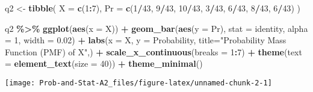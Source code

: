\documentclass[
]{article}
\newenvironment{Shaded}{\begin{snugshade}}{\end{snugshade}}
\newcommand{\AttributeTok}[1]{\textcolor[rgb]{0.13,0.29,0.53}{#1}}
\newcommand{\DecValTok}[1]{\textcolor[rgb]{0.00,0.00,0.81}{#1}}
\newcommand{\FloatTok}[1]{\textcolor[rgb]{0.00,0.00,0.81}{#1}}
\newcommand{\FunctionTok}[1]{\textcolor[rgb]{0.13,0.29,0.53}{\textbf{#1}}}
\newcommand{\NormalTok}[1]{#1}
\newcommand{\OtherTok}[1]{\textcolor[rgb]{0.56,0.35,0.01}{#1}}
\newcommand{\SpecialCharTok}[1]{\textcolor[rgb]{0.81,0.36,0.00}{\textbf{#1}}}
\newcommand{\StringTok}[1]{\textcolor[rgb]{0.31,0.60,0.02}{#1}}
\begin{document}
\begin{Shaded}
\begin{Highlighting}[]
\NormalTok{q2 }\OtherTok{\textless{}{-}} \FunctionTok{tibble}\NormalTok{(}
  \AttributeTok{X =} \FunctionTok{c}\NormalTok{(}\DecValTok{1}\SpecialCharTok{:}\DecValTok{7}\NormalTok{),}
  \AttributeTok{Pr =} \FunctionTok{c}\NormalTok{(}\DecValTok{1}\SpecialCharTok{/}\DecValTok{43}\NormalTok{, }\DecValTok{9}\SpecialCharTok{/}\DecValTok{43}\NormalTok{, }\DecValTok{10}\SpecialCharTok{/}\DecValTok{43}\NormalTok{, }\DecValTok{3}\SpecialCharTok{/}\DecValTok{43}\NormalTok{, }\DecValTok{6}\SpecialCharTok{/}\DecValTok{43}\NormalTok{, }\DecValTok{8}\SpecialCharTok{/}\DecValTok{43}\NormalTok{, }\DecValTok{6}\SpecialCharTok{/}\DecValTok{43}\NormalTok{)}
\NormalTok{)}

\NormalTok{q2 }\SpecialCharTok{\%\textgreater{}\%}
  \FunctionTok{ggplot}\NormalTok{(}\FunctionTok{aes}\NormalTok{(}\AttributeTok{x =}\NormalTok{ X)) }\SpecialCharTok{+}
  \FunctionTok{geom\_bar}\NormalTok{(}\FunctionTok{aes}\NormalTok{(}\AttributeTok{y =}\NormalTok{ Pr), }\AttributeTok{stat =} \StringTok{\textquotesingle{}identity\textquotesingle{}}\NormalTok{, }\AttributeTok{alpha =} \DecValTok{1}\NormalTok{, }\AttributeTok{width =} \FloatTok{0.02}\NormalTok{) }\SpecialCharTok{+}
  \FunctionTok{labs}\NormalTok{(}\AttributeTok{x =} \StringTok{\textquotesingle{}X\textquotesingle{}}\NormalTok{,}
       \AttributeTok{y =} \StringTok{\textquotesingle{}Probability\textquotesingle{}}\NormalTok{,}
       \AttributeTok{title=}\StringTok{"Probability Mass Function (PMF) of X"}\NormalTok{,) }\SpecialCharTok{+}
  \FunctionTok{scale\_x\_continuous}\NormalTok{(}\AttributeTok{breaks =} \DecValTok{1}\SpecialCharTok{:}\DecValTok{7}\NormalTok{) }\SpecialCharTok{+}
  \FunctionTok{theme}\NormalTok{(}\AttributeTok{text =} \FunctionTok{element\_text}\NormalTok{(}\AttributeTok{size =} \DecValTok{40}\NormalTok{)) }\SpecialCharTok{+}
  \FunctionTok{theme\_minimal}\NormalTok{()}
\end{Highlighting}
\end{Shaded}

\begin{center}\texttt{[image: Prob-and-Stat-A2\_files/figure-latex/unnamed-chunk-2-1]} \end{center}
\end{document}
